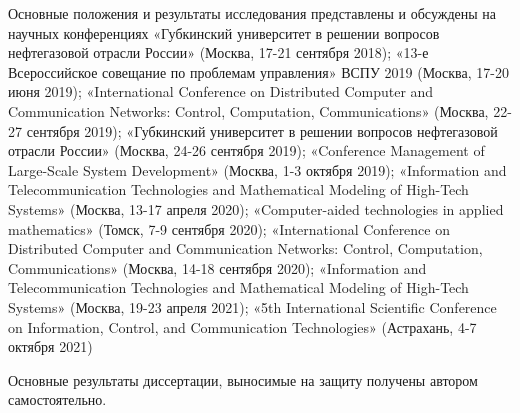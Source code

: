 {\probation}
Основные положения и результаты исследования представлены и обсуждены на научных конференциях «Губкинский университет в решении вопросов нефтегазовой отрасли России» (Москва, 17-21 сентября 2018); «13-е Всероссийское совещание по проблемам управления» ВСПУ 2019 (Москва, 17-20 июня 2019); «International Conference on Distributed Computer and Communication Networks: Control, Computation, Communications» (Москва, 22-27 сентября 2019); «Губкинский университет в решении вопросов нефтегазовой отрасли России» (Москва, 24-26 сентября 2019); «Conference Management of Large-Scale System Development» (Москва, 1-3 октября 2019); «Information and Telecommunication Technologies and Mathematical Modeling of High-Tech Systems» (Москва, 13-17 апреля 2020); «Computer-aided technologies in applied mathematics» (Томск, 7-9 сентября 2020); «International Conference on Distributed Computer and Communication Networks: Control, Computation, Communications» (Москва, 14-18 сентября 2020); «Information and Telecommunication Technologies and Mathematical Modeling of High-Tech Systems» (Москва, 19-23 апреля 2021);  «5th International Scientific Conference on Information, Control, and Communication Technologies» (Астрахань, 4-7 октября 2021)


{\contribution} Основные результаты диссертации, выносимые на защиту получены автором самостоятельно.

